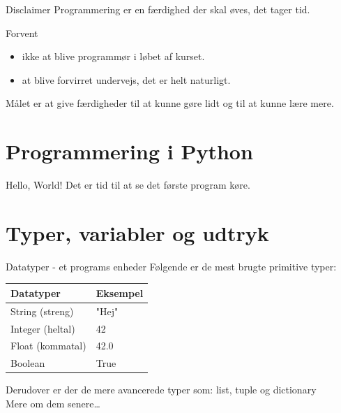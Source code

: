 \documentclass{beamer}
\begin{document}
\begin{frame}{Disclaimer}
Programmering er en færdighed der skal øves, det tager tid.

Forvent
\begin{itemize}
\item ikke at blive programmør i løbet af kurset.
\item at blive forvirret undervejs, det er helt naturligt.
\end{itemize}

Målet er at give færdigheder til at kunne gøre lidt og til at kunne lære mere.
\end{frame}

\section{Programmering i Python}

\begin{frame}{Hello, World!}
Det er tid til at se det første program køre.
\end{frame}
%
%


\section{Typer, variabler og udtryk}

\begin{frame}[fragile]{Datatyper - et programs enheder}
Følgende er de mest brugte primitive typer: 
\begin{center}
\begin{tabular}{ll}
\hline
Datatyper			&		Eksempel 	\\ \hline \hline
String (streng)		&		"Hej"		\\
Integer (heltal)	&		42			\\
Float (kommatal)	&		42.0		\\
Boolean				&		True		\\
\end{tabular}
\end{center}
Derudover er der de mere avancerede typer som: list, tuple og dictionary\\
Mere om dem senere\dots
\end{frame}
\end{document}
